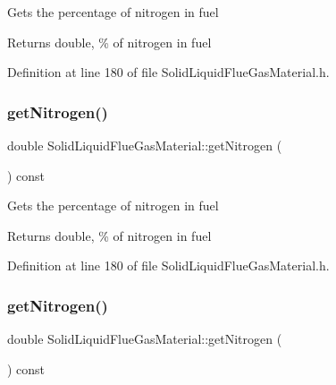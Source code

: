 Gets the percentage of nitrogen in fuel \begin{DoxyReturn}{Returns}
double, \% of nitrogen in fuel 
\end{DoxyReturn}


Definition at line 180 of file Solid\+Liquid\+Flue\+Gas\+Material.\+h.

\mbox{\label{class_solid_liquid_flue_gas_material_a76159a5d9d609f0e0131f7bca3b60ebc}} 
\subsubsection{\texorpdfstring{get\+Nitrogen()}{getNitrogen()}\hspace{0.1cm}{\footnotesize\ttfamily [2/3]}}
{\footnotesize\ttfamily double Solid\+Liquid\+Flue\+Gas\+Material\+::get\+Nitrogen (\begin{DoxyParamCaption}{ }\end{DoxyParamCaption}) const\hspace{0.3cm}{\ttfamily [inline]}}

Gets the percentage of nitrogen in fuel \begin{DoxyReturn}{Returns}
double, \% of nitrogen in fuel 
\end{DoxyReturn}


Definition at line 180 of file Solid\+Liquid\+Flue\+Gas\+Material.\+h.

\mbox{\label{class_solid_liquid_flue_gas_material_a76159a5d9d609f0e0131f7bca3b60ebc}} 
\subsubsection{\texorpdfstring{get\+Nitrogen()}{getNitrogen()}\hspace{0.1cm}{\footnotesize\ttfamily [3/3]}}
{\footnotesize\ttfamily double Solid\+Liquid\+Flue\+Gas\+Material\+::get\+Nitrogen (\begin{DoxyParamCaption}{ }\end{DoxyParamCaption}) const\hspace{0.3cm}{\ttfamily [inline]}}

